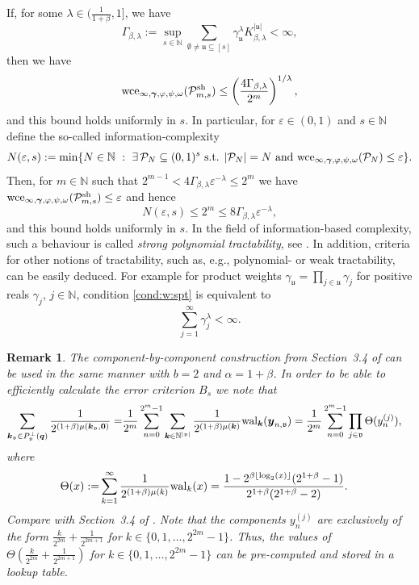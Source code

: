 \documentclass[namedate,webpdf,imanum]{ima-authoring-arxiv}%
\theoremstyle{thmstyletwo}%
\newtheorem{remark}{Remark}%
\numberwithin{equation}{section}
\newcommand{\wal}{{\rm wal}}
\newcommand{\bsy}{\boldsymbol{y}}
\newcommand{\bsk}{\boldsymbol{k}}
\newcommand{\bsq}{\boldsymbol{q}}
\newcommand{\bsgamma}{\boldsymbol{\gamma}}
\newcommand{\bszero}{\boldsymbol{0}}
\newcommand{\uu}{\mathfrak{u}}
\newcommand{\vv}{\mathfrak{v}}
\newcommand{\NN}{\mathbb{N}}
\newcommand{\cP}{\mathcal{P}}
\begin{document}
If, for some $\lambda \in (\frac{1}{1+\beta},1]$, we have 
\begin{equation}\label{cond:w:spt}
\Gamma_{\beta,\lambda}:=\sup_{s \in \NN} \sum_{\emptyset \not= \uu \subseteq [s]} \gamma_{\uu}^\lambda K_{\beta,\lambda}^{|\uu|}< \infty,
\end{equation}
then we have 
$${\rm wce}_{\infty,\bsgamma,\varphi,\psi,\omega}(\cP_{m,s}^{{\rm sh}})\le  \left( \frac{4 \Gamma_{\beta,\lambda}}{2^m}\right)^{1/\lambda},$$ 
and this bound holds uniformly in $s$. In particular, for $\varepsilon \in (0,1)$ and $s \in \NN$ define the so-called information-complexity 
\[
N(\varepsilon,s):=\min\{N \in \NN \ : \ \exists\, \cP_N \subseteq (0,1)^s \mbox{ s.t. $|\cP_N|=N$ and } {\rm wce}_{\infty,\bsgamma,\varphi,\psi,\omega}(\cP_N) \le \varepsilon\}.
\] 
Then, for $m \in \NN$ such that $2^{m-1} < 4 \Gamma_{\beta,\lambda} \varepsilon^{-\lambda} \le 2^m$ we have ${\rm wce}_{\infty,\bsgamma,\varphi,\psi,\omega}(\cP_{m,s}^{{\rm sh}}) \le \varepsilon$ and hence 
$$N(\varepsilon,s) \le 2^m \le 8 \Gamma_{\beta,\lambda} \varepsilon^{-\lambda},$$ 
and this bound holds uniformly in $s$. In the field of information-based complexity, such a behaviour is called {\it strong polynomial tractability}, see \cite{NW08,NW10,NW12}. In addition, criteria for other notions of tractability, such as, e.g., polynomial- or weak tractability, can be easily deduced. For example for product weights $\gamma_{\uu}=\prod_{j \in \uu}\gamma_j$ for positive reals $\gamma_j$, $j \in \NN$, condition \eqref{cond:w:spt} is equivalent to $$\sum_{j=1}^{\infty} \gamma_j^{\lambda} < \infty.$$



\begin{remark}
The component-by-component construction from Section~3.4 of \cite{DKLNS14} can be used in the same manner with $b = 2$ and $\alpha = 1+\beta$. In order to be able to efficiently calculate the error criterion $B_s$ we note that 
\begin{align*}
\sum_{\bsk_\vv \in P^\perp_{\vv}(\bsq)} \frac{1}{2^{ (1+\beta) \mu(\bsk_{\vv}, \bszero)}} = & \frac{1}{2^m} \sum_{n=0}^{2^m-1} \sum_{\bsk \in \NN^{|\vv|}} \frac{1}{2^{(1+\beta) \mu(\bsk)}}  \wal_{\bsk}  (\bsy_{n,\vv})=\frac{1}{2^m} \sum_{n=0}^{2^m-1} \prod_{j \in \vv} \Theta(y_n^{(j)}),
\end{align*}
where 
\begin{align*}
\Theta(x) := & \sum_{k=1}^{\infty} \frac{1}{2^{(1+\beta) \mu(k)}}  \wal_{k}  (x) 
= \frac{1-2^{\beta \lfloor \log_2(x)\rfloor} (2^{1+\beta}-1)}{2^{1+\beta}(2^{1+\beta}-2)}.
\end{align*}
Compare with Section~3.4 of \cite{DKLNS14}. Note that the components $y_n^{(j)}$ are exclusively of the form $\frac{k}{2^{2m}}+\frac{1}{2^{2m +1}}$ for $k \in \{0,1,\ldots,2^{2m}-1\}$. Thus, the values of $\Theta(\frac{k}{2^{2m}}+\frac{1}{2^{2m +1}})$ for $k \in \{0,1,\ldots,2^{2m}-1\}$ can be pre-computed and stored in a lookup table.
\end{remark}
\end{document}
